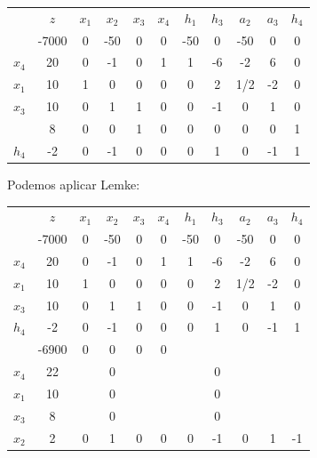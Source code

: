 \begin{enumerate}
\begin{center}
\begin{tabular}{c|c|ccccccccc|}
      & $z$   & $x_1$   & $x_2$   & $x_3$   & $x_4$ & $h_1$ & $h_3$ & $a_2$ & $a_3$ & $h_4$\\ 
      & -7000 & 0       & -50     & 0       & 0     & -50   & 0     & -50   & 0     & 0    \\ 
\hline
$x_4$ & 20    & 0       & -1      & 0       & 1     & 1     & -6    & -2    & 6     & 0    \\ 
$x_1$ & 10    & 1       & 0       & 0       & 0     & 0     & 2     & 1/2   & -2    & 0    \\ 
$x_3$ & 10    & 0       & 1       & 1       & 0     & 0     & -1    & 0     & 1     & 0    \\
\hline
      &  8    & 0       & 0       & 1       & 0     & 0     & 0     & 0     & 0     & 1\\
\hline
$h_4$ &  -2   & 0       & -1      & 0       & 0     & 0     & 1     & 0     & -1    & 1\\
\hline      
\end{tabular}
\end{center}

Podemos aplicar Lemke:

\begin{center}
\begin{tabular}{c|c|ccccccccc|}
      & $z$   & $x_1$   & $x_2$   & $x_3$   & $x_4$ & $h_1$ & $h_3$ & $a_2$ & $a_3$ & $h_4$\\ 
      & -7000 & 0       & -50     & 0       & 0     & -50   & 0     & -50   & 0     & 0    \\ 
\hline
$x_4$ & 20    & 0       & -1      & 0       & 1     & 1     & -6    & -2    & 6     & 0  \\ 
$x_1$ & 10    & 1       & 0       & 0       & 0     & 0     & 2     & 1/2   & -2    & 0  \\ 
$x_3$ & 10    & 0       & 1       & 1       & 0     & 0     & -1    & 0     & 1     & 0  \\
$h_4$ &  -2   & 0       & -1      & 0       & 0     & 0     & 1     & 0     & -1    & 1  \\
\hline      
      & -6900 & 0       & 0       & 0       & 0     &       &       &       &       &     \\ 
\hline
$x_4$ & 22    &         & 0       &         &       &       & 0     &       &       &     \\ 
$x_1$ & 10    &         & 0       &         &       &       & 0     &       &       &     \\ 
$x_3$ & 8     &         & 0       &         &       &       & 0     &       &       &     \\
$x_2$ & 2     & 0       & 1       & 0       & 0     & 0     & -1    & 0     & 1     &  -1 \\
\hline      
\end{tabular}
\end{center}


\end{enumerate}
